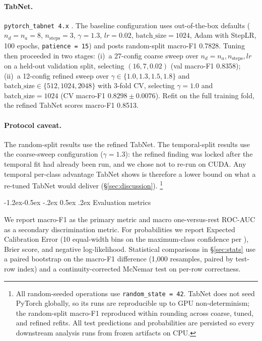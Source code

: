 \documentclass[11pt]{article}
\makeatletter
\renewcommand\subsection{\@startsection{subsection}{2}{\z@}%
  {-1.2ex\@plus -0.5ex \@minus -.2ex}%
  {0.5ex \@plus .2ex}%
  {\normalfont\normalsize\bfseries}}
\newcommand{\mF}{macro-F1}
\makeatother
\begin{document}
\paragraph{TabNet.} \texttt{pytorch\_tabnet 4.x}
\citep{arik2021tabnet}. The baseline configuration uses
out-of-the-box defaults ($n_d = n_a = 8$, $n_{\mathrm{steps}} = 3$,
$\gamma = 1.3$, $lr = 0.02$, $\mathrm{batch\_size} = 1024$, Adam with
StepLR, 100 epochs, \texttt{patience = 15}) and posts random-split
\mF{} 0.7828. Tuning then proceeded in two stages:
(i)~a 27-config coarse sweep over $n_d = n_a, n_{\mathrm{steps}},
lr$ on a held-out validation split, selecting $(16, 7, 0.02)$
(val \mF{} 0.8358); (ii)~a 12-config refined sweep over
$\gamma \in \{1.0, 1.3, 1.5, 1.8\}$ and
$\mathrm{batch\_size} \in \{512, 1024, 2048\}$ with 3-fold CV,
selecting $\gamma = 1.0$ and $\mathrm{batch\_size} = 1024$
(CV \mF{} $0.8298 \pm 0.0076$). Refit on the full training fold,
the refined TabNet scores \mF{} 0.8513.

\paragraph{Protocol caveat.}\label{sec:methods-protocol} The random-split
results use the refined TabNet. The temporal-split results use the
coarse-sweep configuration ($\gamma = 1.3$): the refined finding was
locked after the temporal fit had already been run, and we chose not
to re-run on CUDA. Any temporal per-class advantage TabNet shows is
therefore a lower bound on what a re-tuned TabNet would deliver
(\S\ref{sec:discussion}).%
\footnote{All random-seeded operations use
\texttt{random\_state = 42}. TabNet does not seed PyTorch globally,
so its runs are reproducible up to GPU non-determinism; the
random-split \mF{} reproduced within rounding across coarse, tuned,
and refined refits. All test predictions and probabilities are
persisted so every downstream analysis runs from frozen artifacts on
CPU.}

\subsection{Evaluation metrics}

We report \mF{} as the primary metric and macro one-versus-rest
ROC-AUC as a secondary discrimination metric. For probabilities we
report Expected Calibration Error (10 equal-width bins on the
maximum-class confidence per \citealp{guo2017calibration}),
Brier score, and negative log-likelihood. Statistical comparisons
in \S\ref{sec:stats} use a paired bootstrap on the \mF{} difference
(1{,}000 resamples, paired by test-row index) and a
continuity-corrected McNemar test on per-row correctness.
\end{document}
